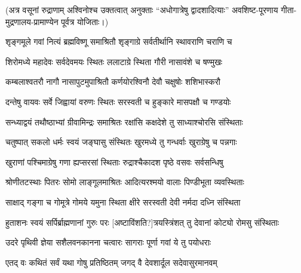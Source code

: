 (अत्र वसूनां रुद्राणाम् अश्विनोश्च उक्तत्वात् अनुक्ताः “अधोगात्रेषु द्वादशादित्याः” अवशिष्ट-पूरणाय गीता-मुद्रणालय-प्रामाण्येन पूर्वत्र योजिताः।)

\twolineshloka
{शृङ्गमूले गवां नित्यं ब्रह्मविष्णू समाश्रितौ}
{शृङ्गाग्रे सर्वतीर्थानि स्थावराणि चराणि च}

\twolineshloka
{शिरोमध्ये महादेवः सर्वदेवमयः स्थितः}
{ललाटाग्रे स्थिता गौरी नासावंशे च षण्मुखः}

\twolineshloka
{कम्बलाश्वतरौ नागौ नासापुटमुपाश्रितौ}
{कर्णयोरश्विनौ देवौ चक्षुषोः शशिभास्करौ}

\twolineshloka
{दन्तेषु वायवः सर्वे जिह्वायां वरुणः स्थितः}
{सरस्वती च हुङ्कारे मासपक्षौ च गण्डयोः}

\twolineshloka
{सन्ध्याद्वयं तथौष्ठाभ्यां ग्रीवामिन्द्रः समाश्रितः}
{रक्षांसि कक्षदेशे तु साध्याश्चोरसि संस्थिताः}

\twolineshloka
{चतुष्पात् सकलो धर्मः स्वयं जङ्घासु संस्थितः}
{खुरमध्ये तु गन्धर्वाः खुराग्रेषु च पन्नगाः}

\twolineshloka
{खुराणां पश्चिमाग्रेषु गणा ह्यप्सरसां स्थिताः}
{रुद्राश्चैकादश पृष्ठे वसवः सर्वसन्धिषु}

\twolineshloka
{श्रोणीतटस्थाः पितरः सोमो लाङ्गूलमाश्रितः}
{आदित्यरश्मयो वालाः पिण्डीभूता व्यवस्थिताः}

\twolineshloka
{साक्षाद् गङ्गा च गोमूत्रे गोमये यमुना स्थिता}
{क्षीरे सरस्वती देवी नर्मदा दध्नि संस्थिता}

\twolineshloka
{हुताशनः स्वयं सर्पिर्ब्राह्मणानां गुरुः परः}
{[अष्टाविंशति?]त्रयस्त्रिंशत् तु देवानां कोट्यो रोमसु संस्थिताः}

\twolineshloka
{उदरे पृथिवी ज्ञेया सशैलवनकानना}
{चत्वारः सागराः पूर्णा गवां ये तु पयोधराः}

\twolineshloka
{एतद् वः कथितं सर्वं यथा गोषु प्रतिष्ठितम्}
{जगद् वै देवशार्दूल सदेवासुरमानवम्}

\closesection
